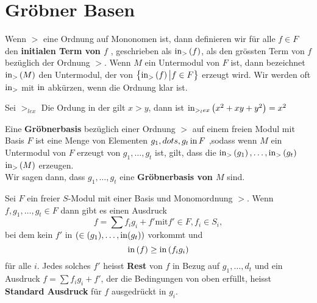 \documentclass{article}
\begin{document}
\section{Gr\"obner Basen}
\begin{defn}
	Wenn 
	\( > \)
	eine Ordnung auf Mononomen ist,
	dann definieren wir f\"ur alle 
	\( f \in F \)
	den \textbf{initialen Term von \( f\) },
	geschrieben als 
	\( \operatorname{in}_{>} \left( f \right) \),
	als den gr\"ossten Term von 
	\( f \) 
	bez\"uglich der Ordnung
	\( > \).
	Wenn 
	\( M \) 
	ein Untermodul von 
	\( F \) 
	ist,
	dann bezeichnet 
	\( \operatorname{in}_{>} \left( M \right) \)
	den Untermodul, 
	der von 
	\( \left\{ \operatorname{in}_{>} \left( f \right) \big| f \in F \right\}\)
	erzeugt wird.
	Wir werden oft 
	\( \operatorname{in}_{>} \)
	mit 
	\( \operatorname{in} \)
	abk\"urzen,
	wenn die Ordnung klar ist.
\end{defn}
\begin{bsp}
	Sei 
	\( >_{lex} \) 
	Die Ordung in der gilt
	\( x > y \),
	dann ist 
	\( \operatorname{in}_{>_lex} \left( x^{2}+xy +y^{2} \right)=x^{2} \)

\end{bsp}
\begin{defn}
	Eine \textbf{Gr\"obnerbasis} bez\"uglich einer Ordnung 
	\( > \)
	auf einem freien Modul mit Basis
	\(F \)
	ist eine Menge von Elementen
	\( g_{1},dots,g_{t} \operatorname{in} F \)
	,sodass wenn 
	\( M \) 
	ein Untermodul von 
	\( F \) 
	erzeugt von
	\( g_{1}, \dots , g_{t} \)
	ist,
	gilt, dass die
	\( \operatorname{in}_{>}  \left(  g_{1} \right),
	\dots,
	\operatorname{in}_{>} \left( g_{t} \right) \)
	\( \operatorname{in}_{>} \left( M \right) \)
	erzeugen. \\
	Wir sagen dann,
	dass
	\( g_{1},\dots,g_{t} \)
	eine
	\textbf{Gr\"obnerbasis von \( M \)}
	sind.


\end{defn}
\begin{propdef}
	Sei
	\( F \) 
	ein freier 
	\( S \)-Modul
	mit einer Basis und Monomordnung 
	\( >\).
	Wenn 
	\( f,g_1,\dots,g_t \in F \) 
	dann gibt es einen Ausdruck 
	\[
		f= \sum f_i g_i +f' \text{mit} f' \in F, f_i \in S_i ,
	\]
	bei dem kein 
	\( f' \)
	in
	\( \left( \in(g_1),\dots,\operatorname{in}(g_t) \right) \) 
	vorkommt und 
	\[
		\operatorname{in}\left( f \right) \ge \operatorname{in}\left( f_i g_i  \right)
	\]
	f\"ur alle 
	\( i \).
	Jedes solches 
	\( f' \)
	heisst \textbf{Rest} von 
	\( f \) 
	in Bezug auf 
	\( g_{1},\dots,d_{t} \)
	und ein Ausdruck 
	\( f=\sum f_{i} g_{i} + f' \),
	der die Bedingungen von oben erf\"ullt,
	heisst
	\textbf{Standard Ausdruck} f\"ur 
	\(f\) 
	ausgedr\"uckt in
	\( g_{i} \).
\end{propdef}
\end{document}
